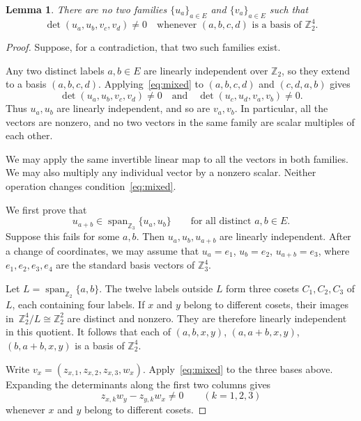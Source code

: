 \documentclass{amsart}
\theoremstyle{plain}
\newtheorem{lemma}[theorem]{Lemma}
\numberwithin{equation}{section}
\theoremstyle{remark}
\theoremstyle{definition}
\newcommand{\Z}{\mathbb Z}
\newcommand{\spn}[2]{\operatorname{span}_{\Z_#1}\{#2\}}
\newcommand{\wideand}{\quad \text{and} \quad}
\begin{document}
\begin{lemma}\label{lem:mixed}
    There are no two families $\{u_a\}_{a\in E}$ and $\{v_a\}_{a\in E}$ such that
    \begin{equation}\label{eq:mixed}
        \det(u_a,u_b,v_c,v_d)\ne0 \quad\text{whenever }(a,b,c,d)\text{ is a basis of }\Z_2^4.
    \end{equation}
\end{lemma}
\begin{proof}
Suppose, for a contradiction, that two such families exist.

Any two distinct labels $a,b\in E$ are linearly independent over $\Z_2$, so they extend to a basis $(a,b,c,d)$.
Applying~\eqref{eq:mixed} to $(a,b,c,d)$ and $(c,d,a,b)$ gives
$$
    \det(u_a,u_b,v_c,v_d)\ne0 \wideand \det(u_c,u_d,v_a,v_b)\ne0.
$$
Thus $u_a,u_b$ are linearly independent, and so are $v_a,v_b$.
In particular, all the vectors are nonzero, and no two vectors in the same family are scalar multiples of each other.

We may apply the same invertible linear map to all the vectors in both families.
We may also multiply any individual vector by a nonzero scalar.
Neither operation changes condition~\eqref{eq:mixed}.

We first prove that
\begin{equation}\label{eq:mixed-span}
    u_{a+b}\in \spn{3}{u_a,u_b} \qquad\text{for all distinct }a,b\in E.
\end{equation}
Suppose this fails for some $a,b$.
Then $u_a,u_b,u_{a+b}$ are linearly independent.
After a change of coordinates, we may assume that $u_a=e_1$, $u_b=e_2$, $u_{a+b}=e_3$, where $e_1,e_2,e_3,e_4$ are the standard basis vectors of $\Z_3^4$.

Let $L=\spn{2}{a,b}$.
The twelve labels outside $L$ form three cosets $C_1,C_2,C_3$ of $L$, each containing four labels.
If $x$ and $y$ belong to different cosets, their images in~$\Z_2^4/L\cong\Z_2^2$ are distinct and nonzero.
They are therefore linearly independent in this quotient.
It follows that each of $(a,b,x,y)$, $(a,a+b,x,y)$, $(b,a+b,x,y)$ is a basis of $\Z_2^4$.

Write $v_x=(z_{x,1},z_{x,2},z_{x,3},w_x)$.
Apply~\eqref{eq:mixed} to the three bases above.
Expanding the determinants along the first two columns gives
\begin{equation}\label{eq:ratios}
    z_{x,k}w_y-z_{y,k}w_x\ne0  \qquad(k=1,2,3)
\end{equation}
whenever $x$ and $y$ belong to different cosets.


\end{proof}
\end{document}
